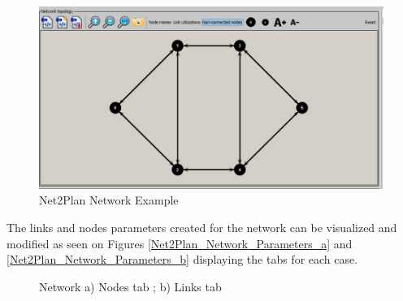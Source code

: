 	\pagebreak
	\begin{figure}[h!]
		\centering
		\includegraphics[width = 12cm]{Net2Plan_Network_1.pdf}
		\caption{Net2Plan Network Example}
		\label{Net2Plan_Network_1}
	\end{figure}

	The links and nodes parameters created for the network can be visualized and modified as seen on Figures \ref{Net2Plan_Network_Parameters_a} and \ref{Net2Plan_Network_Parameters_b} displaying the tabs for each case.
	

	\begin{figure}[!h]
		\centering
		\caption{Network a) Nodes tab ; b) Links tab}
	\end{figure}	
	
